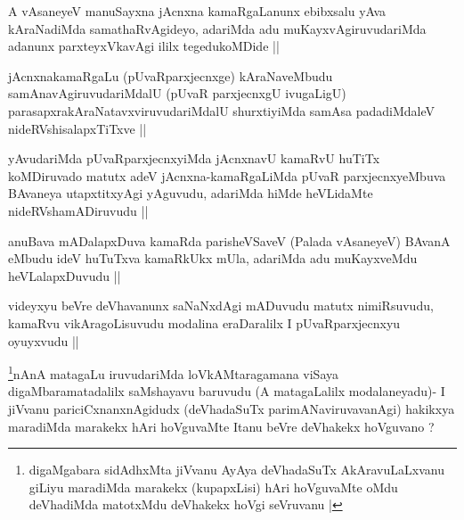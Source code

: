 \begin{artha}
A vAsaneyeV manuSayxna jAcnxna kamaRgaLanunx ebibxsalu yAva
kAraNadiMda samathaRvAgideyo, adariMda adu muKayxvAgiruvudariMda
adanunx parxteyxVkavAgi ililx tegedukoMDide ||
\end{artha}


\begin{artha}
jAcnxnakamaRgaLu (pUvaRparxjecnxge) kAraNaveMbudu
samAnavAgiruvudariMdalU (pUvaR parxjecnxgU ivugaLigU)
parasapxrakAraNatavxviruvudariMdalU shurxtiyiMda samAsa padadiMdaleV
nideRVshisalapxTiTxve ||
\end{artha}

\begin{artha}
yAvudariMda pUvaRparxjecnxyiMda jAcnxnavU kamaRvU huTiTx koMDiruvado
matutx adeV jAcnxna-kamaRgaLiMda pUvaR parxjecnxyeMbuva BAvaneya
utapxtitxyAgi yAguvudu, adariMda hiMde heVLidaMte nideRVshamADiruvudu ||
\end{artha}


\begin{artha}
anuBava mADalapxDuva kamaRda parisheVSaveV (Palada vAsaneyeV) BAvanA
eMbudu ideV huTuTxva kamaRkUkx mUla, adariMda adu muKayxveMdu
heVLalapxDuvudu ||
\end{artha}

\begin{artha}
videyxyu beVre deVhavanunx saNaNxdAgi mADuvudu matutx nimiRsuvudu,
kamaRvu vikAragoLisuvudu  modalina eraDaralilx I pUvaRparxjecnxyu
oyuyxvudu ||
\end{artha}


\begin{artha}
\footnote{digaMgabara sidAdhxMta jiVvanu AyAya deVhadaSuTx
  AkAravuLaLxvanu giLiyu maradiMda marakekx (kupapxLisi) hAri
  hoVguvaMte oMdu deVhadiMda matotxMdu deVhakekx hoVgi seVruvanu |}nAnA matagaLu iruvudariMda loVkAMtaragamana viSaya digaMbaramatadalilx
saMshayavu baruvudu  (A matagaLalilx modalaneyadu)- I jiVvanu
pariciCxnanxnAgidudx (deVhadaSuTx parimANaviruvavanAgi) hakikxya
maradiMda marakekx hAri hoVguvaMte Itanu beVre deVhakekx hoVguvano ?
\end{artha}


